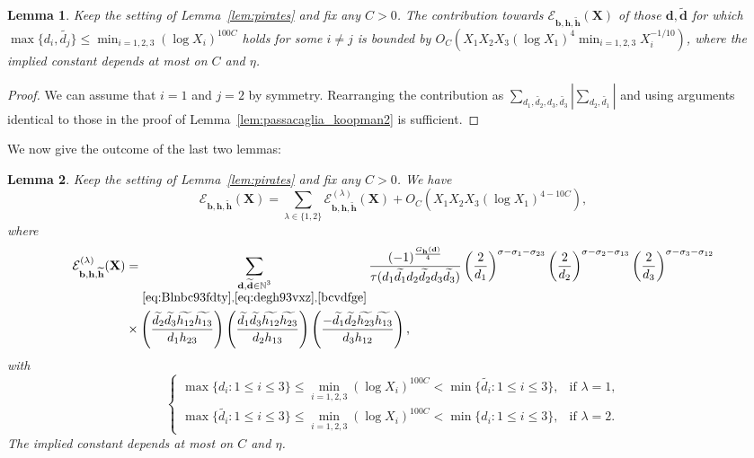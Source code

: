 \documentclass[a4paper,12pt,reqno]{amsart}
\numberwithin{equation}{section} \numberwithin{figure}{section}
\newcommand\N{\mathbb{N}}
\renewcommand{\l}{\left}
\renewcommand{\r}{\right}
\renewcommand{\b}{\mathbf}
\renewcommand{\c}{\mathcal}
\renewcommand{\leq}{\leqslant}
\renewcommand{\#}{\sharp}
\newtheorem{lemma}{Lemma}
\theoremstyle{definition}
\numberwithin{lemma}{section}
\begin{document}
 

 \begin{lemma}
\label{lem:passacaglia bwv 582}Keep the setting of Lemma~\ref{lem:pirates} and  fix any $C> 0 $.
The contribution towards 
$\mathcal{E}_{\b b, \mathbf{h}, \widetilde{\mathbf{h}}}(\b X)$  
of those $\b d,\widetilde{\b d}$ 
for which $ \max\{ d_i, \widetilde{d_j}   \} \leq \min_{i=1,2,3} (\log  X_i)^{100 C}
$ holds  for  some    $i\neq j$    is  bounded by  
$O_C( X_1X_2X_3  (\log X_1 )^4 \min_{i=1,2,3}X_i^{-1/10})$,  
where the implied constant depends at most on $C$ and $\eta$. 
\end{lemma}
\begin{proof}
We can assume that $i=1$ and $j=2 $  by symmetry. Rearranging the contribution as $ \sum_{d_1, \widetilde{d_2}   , d_3, \widetilde{d_3}  }  | \sum_{   d_2, \widetilde{d_1}  } |$ and using arguments  identical to those in the proof of Lemma~\ref{lem:passacaglia_koopman2}     
is sufficient. \end{proof} 
We now give the outcome of the last two lemmas:
\begin{lemma}
\label{lem:K. 622 - Adagio } Keep the setting of Lemma~\ref{lem:pirates} and  fix any $C> 0 $.
We have  \[\mathcal{E}_{\b b, \mathbf{h}, \widetilde{\mathbf{h}}}(\b X)=\sum_{\lambda \in \{1,2\}}  \c {E}_{  \b b,\b h ,  \widetilde{\b h } }^{(\lambda)}( \b X ) 
+O_C \l ( X_1X_2X_3   (\log X_1 )^{4  -   10C  } \r ),\] where 
 \begin{align*}   \c {E}_{  \b b,\b h ,  \widetilde{\b h } }^{(\lambda)}( \b X ) &=
 \sum_{\substack{ \b d , \widetilde{\b d}   \in   \N^3  \\  \eqref {eq:Blnbc93fdty} ,   \eqref{eq:degh93vxz}, \eqref{bcvdfge} }} \frac {  (-1)^{\frac{G_{\b h }(\b d)  }{4} }  }{
\tau(  d_1 \widetilde{d_1}   d_2  \widetilde{d_2} d_3 \widetilde{d_3}  )} 
 \l(\frac{2}{  d_1 } \r)^{\sigma-\sigma_1-\sigma_{23} } \l(\frac{2}{  d_2 } \r)^{\sigma-\sigma_2-\sigma_{13} }
\l(\frac{2}{  d_3 } \r)^{\sigma-\sigma_3-\sigma_{12} }
 \\  &\times  \l(\frac{          \widetilde{d_2 }   \widetilde{d_3}  \widetilde{h_{12} }    \widetilde{ h_{13} }    }{d_1   h_{23}  }\r) 
    \l(\frac{             \widetilde{d_1}   \widetilde{d_3}  \widetilde{h_{12} }      \widetilde{h_{23} }   }{d_2   h_{13}  }\r) 
\l(\frac{    -     \widetilde{d_1}  \widetilde{d_2 }  \widetilde{h_{23} }  \widetilde{ h_{13} }    }{d_3  h_{12} }\r)  
,\end{align*} with \begin{equation}\label{bcvdfge}\begin{cases}   
\max\{d_i:1\leq i \leq 3\}   \leq \min_{i=1,2,3} (\log  X_i)^{100 C} < \min\{\widetilde{d_i }  :1\leq i \leq 3\} ,&\mbox{if } \lambda=1,\\  
\max\{\widetilde{d_i }  :1\leq i \leq 3\}   \leq \min_{i=1,2,3} (\log  X_i)^{100 C} < \min\{d_i:1\leq i \leq 3\} ,&\mbox{if } \lambda=2.
\end{cases}\end{equation}
The implied constant depends at most on $C$ and $\eta$. \end{lemma}  
\end{document}
